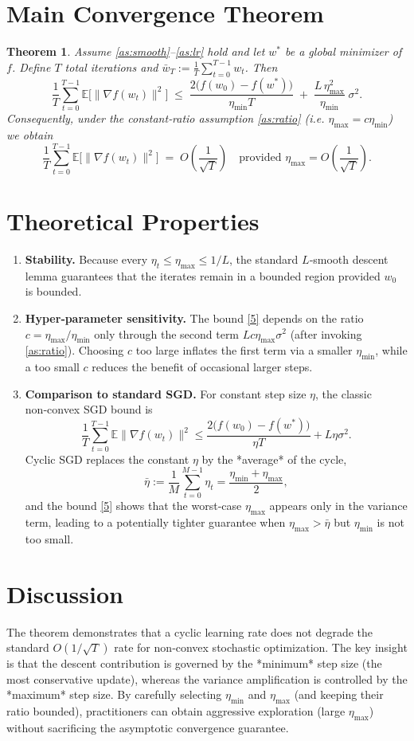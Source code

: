 \documentclass[11pt]{article}
\newtheorem{theorem}{Theorem}
\begin{document}
\section*{Main Convergence Theorem}
\begin{theorem}\label{thm:main}
Assume \ref{as:smooth}–\ref{as:lr} hold and let $w^*$ be a global minimizer of $f$.
Define $T$ total iterations and $\bar w_T:=\frac1T\sum_{t=0}^{T-1}w_t$.
Then
\[
\frac1T\sum_{t=0}^{T-1}\mathbb{E}\big[\|\nabla f(w_t)\|^2\big]
\;\le\;
\frac{2\big(f(w_0)-f(w^*)\big)}{\eta_{\min}T}
\;+\;
\frac{L\,\eta_{\max}^{2}}{\eta_{\min}}\;\sigma^{2}.
\tag{5}
\]
Consequently, under the constant‑ratio assumption \ref{as:ratio} (i.e. $\eta_{\max}=c\eta_{\min}$) we obtain
\[
\frac1T\sum_{t=0}^{T-1}\mathbb{E}\big[\|\nabla f(w_t)\|^2\big]
\;=\;
O\!\left(\frac{1}{\sqrt{T}}\right)
\quad\text{provided }\eta_{\max}=O\!\left(\frac{1}{\sqrt{T}}\right).
\]
\end{theorem}

\section*{Theoretical Properties}
\begin{enumerate}
\item \textbf{Stability.} Because every $\eta_t\le\eta_{\max}\le1/L$, the standard $L$‑smooth descent lemma guarantees that the iterates remain in a bounded region provided $w_0$ is bounded.
\item \textbf{Hyper‑parameter sensitivity.} The bound \eqref{5} depends on the ratio $c=\eta_{\max}/\eta_{\min}$ only through the second term $L c\eta_{\max}\sigma^{2}$ (after invoking \ref{as:ratio}). Choosing $c$ too large inflates the first term via a smaller $\eta_{\min}$, while a too small $c$ reduces the benefit of occasional larger steps.
\item \textbf{Comparison to standard SGD.} For constant step size $\eta$, the classic non‑convex SGD bound is
\[
\frac1T\sum_{t=0}^{T-1}\mathbb{E}\|\nabla f(w_t)\|^2\le
\frac{2\big(f(w_0)-f(w^*)\big)}{\eta T}+L\eta\sigma^2 .
\]
Cyclic SGD replaces the constant $\eta$ by the *average* of the cycle,
\[
\bar\eta:=\frac{1}{M}\sum_{t=0}^{M-1}\eta_t=\frac{\eta_{\min}+\eta_{\max}}{2},
\]
and the bound \eqref{5} shows that the worst‑case $\eta_{\max}$ appears only in the variance term, leading to a potentially tighter guarantee when $\eta_{\max}>\bar\eta$ but $\eta_{\min}$ is not too small.
\end{enumerate}

\section*{Discussion}
The theorem demonstrates that a cyclic learning rate does not degrade the standard $O(1/\sqrt{T})$ rate for non‑convex stochastic optimization. The key insight is that the descent contribution is governed by the *minimum* step size (the most conservative update), whereas the variance amplification is controlled by the *maximum* step size. By carefully selecting $\eta_{\min}$ and $\eta_{\max}$ (and keeping their ratio bounded), practitioners can obtain aggressive exploration (large $\eta_{\max}$) without sacrificing the asymptotic convergence guarantee.
\end{document}
